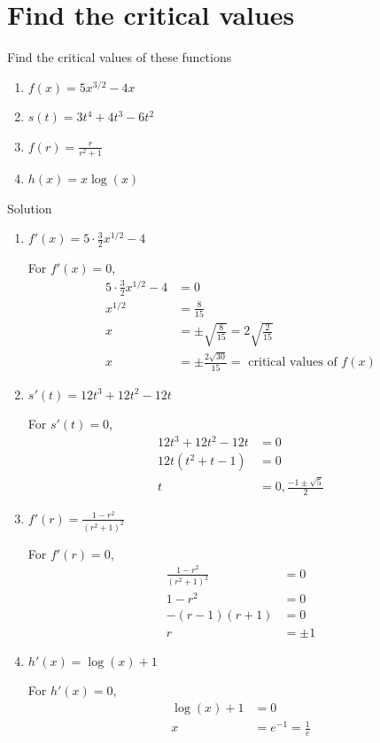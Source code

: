 \documentclass[12pt]{article}
\begin{document}
\section{Find the critical values}
Find the critical values of these functions
\begin{enumerate}
    \item $f(x)= 5x^{3/2} -4x$
    \item $s(t) = 3t^4 + 4t^3 - 6t^2$
    \item $f(r) = \frac{r}{r^2+1}$
    \item $h(x) = x\log(x)$
\end{enumerate}
Solution
\begin{enumerate}
    \item $f'(x)= 5\cdot \frac{3}{2}x^{1/2} -4$
    
    For $f'(x)=0$, 
    \begin{align*}
            5\cdot \frac{3}{2}x^{1/2} -4 &=0
            \\ x^{1/2} &= \frac{8}{15}
            \\ x &= \pm \sqrt{\frac{8}{15}} = 2\sqrt{\frac{2}{15}}
            \\ x &= \pm \frac{2\sqrt{30}}{15} = \text{ critical values of } f(x)
    \end{align*}
    \item $s'(t) = 12t^3 + 12t^2 - 12t$

    For $s'(t)=0$,
    \begin{align*}
        12t^3 + 12t^2 - 12t &= 0
        \\ 12t(t^2 +t -1) &=0
        \\ t &= 0, \frac{-1 \pm \sqrt{5}}{2}
    \end{align*}
    \item $f'(r) = \frac{1 - r^2}{(r^2+1)^2}$

    For $f'(r)=0$,
    \begin{align*}
        \frac{1 - r^2}{(r^2+1)^2} &=0
        \\ 1-r^2 &= 0 
        \\ -(r-1)(r+1) &=0
        \\ r&= \pm 1
    \end{align*}
    \item $h'(x) = \log(x)+ 1$

    For $h'(x)=0$,
    \begin{align*}
        \log(x)+1&=0
        \\ x &= e^{-1}=\frac{1}{e}
    \end{align*}
\end{enumerate}
\end{document}

